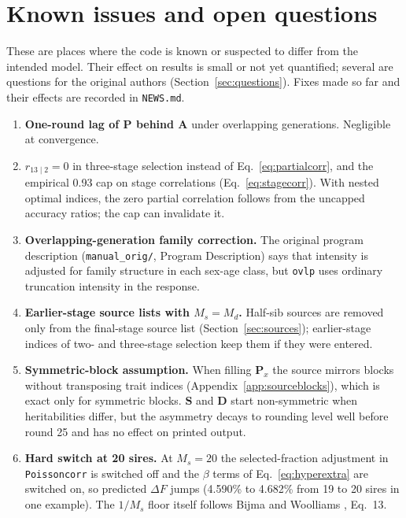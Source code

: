 \documentclass[11pt]{article}
\newcommand{\src}[1]{\texttt{#1}}
\newcommand{\ma}[1]{\mathbf{#1}}
\begin{document}
\section{Known issues and open questions}\label{sec:issues}
\begin{inwords}
These are places where the code is known or suspected to differ from the intended model. Their effect on results is small or not yet quantified; several are questions for the original authors (Section~\ref{sec:questions}). Fixes made so far and their effects are recorded in \src{NEWS.md}.
\end{inwords}
\begin{enumerate}
\item \textbf{One-round lag of $\ma P$ behind $\ma A$} under overlapping generations. Negligible at convergence.
\item \textbf{$r_{13\mid2}=0$} in three-stage selection instead of Eq.~\eqref{eq:partialcorr}, and the empirical 0.93 cap on stage correlations (Eq.~\eqref{eq:stagecorr}). With nested optimal indices, the zero partial correlation follows from the uncapped accuracy ratios; the cap can invalidate it.
\item \textbf{Overlapping-generation family correction.} The original program description (\src{manual\_orig/}, Program Description) says that intensity is adjusted for family structure in each sex-age class, but \src{ovlp} uses ordinary truncation intensity in the response.
\item \textbf{Earlier-stage source lists with $M_s=M_d$.} Half-sib sources are removed only from the final-stage source list (Section~\ref{sec:sources}); earlier-stage indices of two- and three-stage selection keep them if they were entered.
\item \textbf{Symmetric-block assumption.} When filling $\ma P_x$ the source mirrors blocks without transposing trait indices (Appendix~\ref{app:sourceblocks}), which is exact only for symmetric blocks. $\ma S$ and $\ma D$ start non-symmetric when heritabilities differ, but the asymmetry decays to rounding level well before round 25 and has no effect on printed output.
\item \textbf{Hard switch at 20 sires.} At $M_s=20$ the selected-fraction adjustment in \src{Poissoncorr} is switched off and the $\beta$ terms of Eq.~\eqref{eq:hyperextra} are switched on, so predicted $\Delta F$ jumps (4.590\% to 4.682\% from 19 to 20 sires in one example). The $1/M_s$ floor itself follows Bijma and Woolliams \cite{bijmawoolliams2000}, Eq.~13.

\end{enumerate}
\end{document}
